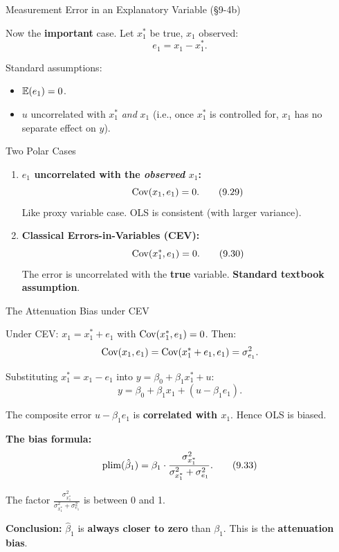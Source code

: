\documentclass[aspectratio=169, 12pt]{beamer}
\begin{document}
\begin{frame}[shrink=30]{Measurement Error in an Explanatory Variable (\S9-4b)}

  Now the \textbf{important} case. Let $x_1^*$ be true, $x_1$ observed:
  \[
    e_1 = x_1 - x_1^*. \tag{9.28}
  \]

  Standard assumptions:
  \begin{itemize}\setlength{\itemsep}{1pt}
    \item $\operatorname{\mathbb{E}}(e_1) = 0$.
    \item $u$ uncorrelated with $x_1^*$ \emph{and} $x_1$ (i.e., once $x_1^*$ is controlled
    for, $x_1$ has no separate effect on $y$).
  \end{itemize}

  \begin{definitionbox}{Two Polar Cases}
    \begin{enumerate}\setlength{\itemsep}{2pt}
      \item \textbf{$e_1$ uncorrelated with the \emph{observed} $x_1$:}
      \[
        \operatorname{Cov}(x_1, e_1) = 0. \tag{9.29}
      \]
      Like proxy variable case. OLS is consistent (with larger variance).

      \item \textbf{Classical Errors-in-Variables (CEV):}
      \[
        \operatorname{Cov}(x_1^*, e_1) = 0. \tag{9.30}
      \]
      The error is uncorrelated with the \textbf{true} variable. \textbf{Standard textbook
      assumption}.
    \end{enumerate}
  \end{definitionbox}

\end{frame}

\begin{frame}[shrink=15]{The Attenuation Bias under CEV}

  Under CEV: $x_1 = x_1^* + e_1$ with $\operatorname{Cov}(x_1^*, e_1) = 0$. Then:
  \[
    \operatorname{Cov}(x_1, e_1) = \operatorname{Cov}(x_1^* + e_1, e_1) = \sigma_{e_1}^2.
  \]

  Substituting $x_1^* = x_1 - e_1$ into $y = \beta_0 + \beta_1 x_1^* + u$:
  \[
    y = \beta_0 + \beta_1 x_1 + (u - \beta_1 e_1). \tag{9.32}
  \]

  The composite error $u - \beta_1 e_1$ is \textbf{correlated with $x_1$}. Hence OLS is biased.

  \begin{highlightbox}
    \textbf{The bias formula:}
    \[
      \operatorname{plim}(\hat{\beta}_1) = \beta_1 \cdot \frac{\sigma_{x_1^*}^2}{\sigma_{x_1^*}^2 + \sigma_{e_1}^2}. \tag{9.33}
    \]

    \medskip
    The factor $\frac{\sigma_{x_1^*}^2}{\sigma_{x_1^*}^2 + \sigma_{e_1}^2}$ is between 0 and 1.

    \medskip
    \textbf{Conclusion:} $\hat{\beta}_1$ is \textbf{always closer to zero} than $\beta_1$. This
    is the \textbf{attenuation bias}.
  \end{highlightbox}

\end{frame}
\end{document}
